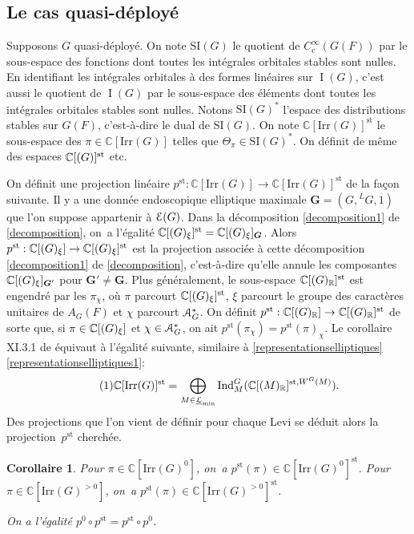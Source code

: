 \documentclass[11pt]{article}
\newcommand{\skpt}{\smallskip}
\numberwithin{equation}{section}\providecommand{\og}{«\,}\providecommand{\fg}{\,»}
\let\mathcal \EuScript
\let\oldenumerate\enumerate
\renewcommand{\enumerate}{\oldenumerate\itemindent0pt}
\newenvironment{enumeratei}
{\bgroup\def\theenumi{\roman{enumi}}\def\theenumii{\arabic{enumii}}\oldenumerate}
{\endenumerate\egroup}
\newcommand{\NoChangel}[1]{%
\expandafter\let\csname old\string#1\endcsname=#1
\let#1=\relax
\newcommand{#1}{\mathcode`l="716C\csname old\string#1\endcsname\mathcode`l="7160 }%
}
\newcommand{\rc}{\mathrm{c}}
\newcommand{\Ell}{\mathrm{Ell}} \NoChangel{\Ell}
\newcommand{\Ind}{\mathrm{Ind}}
\newcommand{\Irr}{\mathrm{Irr}}
\newcommand{\SI}{\mathrm{SI}}
\newcommand{\st}{\mathrm{st}}
\DeclareMathOperator{\rI}{I}
\newcommand{\bG}{\boldsymbol{G}}
\newcommand{\cA}{\mathcal{A}}
\newcommand{\cE}{\mathcal{E}}
\newcommand{\cL}{\mathcal{L}}
\newcommand{\CC}{\mathbb{C}}
\newcommand{\RR}{\mathbb{R}}
\theoremstyle{plain}
\newtheorem*{cor*}{Corollaire}
\theoremstyle{definition}
\begin{document}
\subsection{Le cas quasi-déployé}\label{lecasquasideploye}
Supposons $G$ quasi-déployé. On note $\SI(G)$ le quotient de $C_{\rc}^{\infty}(G(F))$ par le sous-espace des fonctions dont toutes les intégrales orbitales stables sont nulles. En identifiant les intégrales orbitales à des formes linéaires sur $\rI(G)$, c'est aussi le quotient de $\rI(G)$ par le sous-espace des éléments dont toutes les intégrales orbitales stables sont nulles. Notons
$\SI(G)^*$ l'espace des distributions stables sur $G(F)$, c'est-à-dire le dual de $\SI(G)$. On note $\CC[\Irr(G)]^{\st}$ le sous-espace des $\pi\in \CC[\Irr(G)]$ telles que $\Theta_{\pi}\in \SI(G)^*$. On définit de même des espaces $\CC[\Ell(G)]^{\st}$ etc.

On définit une projection linéaire $p^{\st}:\CC[\Irr(G)]\to \CC[\Irr(G)]^{\st}$ de la façon suivante.
Il y a une donnée endoscopique elliptique maximale $\bG=(G,{^LG},1)$ que l'on suppose appartenir à $\cE(G)$. Dans la décomposition \eqref{decomposition1} de \ref{decomposition}, on~a l'égalité $\CC[\Ell(G)_{\xi}]^{\st} =\CC[\Ell(G)_{\xi}]_{\bG}$. Alors $p^{\st}:\CC[\Ell(G)_{\xi}]\to \CC[\Ell(G)_{\xi}]^{\st}$ est la projection associée à cette décomposition \eqref{decomposition1} de \ref{decomposition}, c'est-à-dire qu'elle annule les composantes $\CC[\Ell(G)_{\xi}]_{\bG'}$ pour $\bG'\neq\bG$.
Plus généralement, le sous-espace $\CC[\Ell(G)_{\RR}]^{\st}$ est engendré par les $\pi_{\chi}$, où $\pi$ parcourt $\CC[\Ell(G)_{\xi}]^{\st}$, $\xi$ parcourt le groupe des caractères unitaires de $A_{G}(F)$ et $\chi$ parcourt $\cA_{G}^*$. On définit $p^{\st}:\CC[\Ell(G)_{\RR}]\to \CC[\Ell(G)_{\RR}]^{\st}$ de sorte que, si $\pi\in \CC[\Ell(G)_{\xi}]$ et $\chi\in \cA_{G}^*$, on ait $p^{\st}(\pi_{\chi})=p^{\st}(\pi)_{\chi}$.
Le corollaire XI.3.1 de \cite{MW} équivaut à l'égalité suivante, similaire à \ref{representationselliptiques}\,\eqref{representationselliptiques1}:\vspace*{-3pt}\enlargethispage{.6\baselineskip}%
\begin{equation}\tag{1}\label{lecasquasideploye1}
\CC[\Irr(G)]^{\st}=\bigoplus_{M\in \underline{\cL}_{\min}}\Ind_{M}^G(\CC[\Ell(M)_{\RR}]^{\st,W^G(M)}).
\end{equation}
Des projections que l'on vient de définir pour chaque Levi se déduit alors la projection~$p^{\st}$ cherchée.

\skpt
\begin{cor*}
\begin{enumeratei}
\item\label{lecasquasideployei}
Pour $\pi\in \CC[\Irr(G)^0]$, on~a $p^{\st}(\pi)\in \CC[\Irr(G)^0]^{\st}$. Pour $\pi\in \CC[\Irr(G)^{>0}]$, on~a $p^{\st}(\pi)\in \CC[\Irr(G)^{>0}]^{\st}$.

\item\label{lecasquasideployeii}
On a l'égalité $p^0\circ p^{\st}=p^{\st}\circ p^0$.
\end{enumeratei}
\end{cor*}
\end{document}
